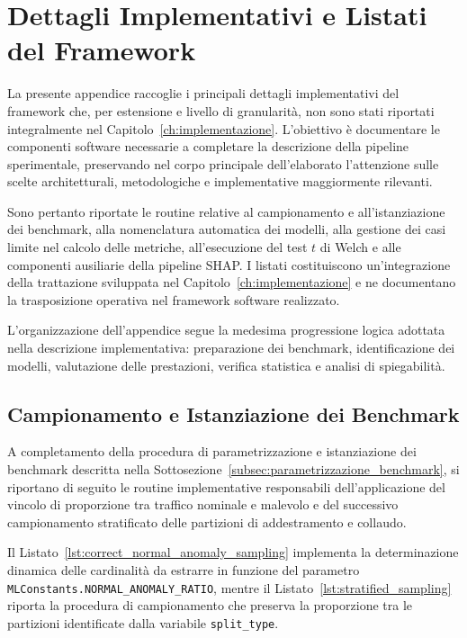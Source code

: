 \chapter{Dettagli Implementativi e Listati del Framework}
\label{app:implementazione}

La presente appendice raccoglie i principali dettagli implementativi del framework che, per estensione e livello di granularità, non sono stati riportati integralmente nel Capitolo~\ref{ch:implementazione}.
L'obiettivo è documentare le componenti software necessarie a completare la descrizione della pipeline sperimentale, preservando nel corpo principale dell'elaborato l'attenzione sulle scelte architetturali, metodologiche e implementative maggiormente rilevanti.

Sono pertanto riportate le routine relative al campionamento e all'istanziazione dei benchmark, alla nomenclatura automatica dei modelli, alla gestione dei casi limite nel calcolo delle metriche, all'esecuzione del test $t$ di Welch e alle componenti ausiliarie della pipeline SHAP.
I listati costituiscono un'integrazione della trattazione sviluppata nel Capitolo~\ref{ch:implementazione} e ne documentano la trasposizione operativa nel framework software realizzato.

L'organizzazione dell'appendice segue la medesima progressione logica adottata nella descrizione implementativa: preparazione dei benchmark, identificazione dei modelli, valutazione delle prestazioni, verifica statistica e analisi di spiegabilità.


\section{Campionamento e Istanziazione dei Benchmark}
\label{app:campionamento_benchmark}

A completamento della procedura di parametrizzazione e istanziazione dei benchmark descritta nella Sottosezione~\ref{subsec:parametrizzazione_benchmark}, si riportano di seguito le routine implementative responsabili dell'applicazione del vincolo di proporzione tra traffico nominale e malevolo e del successivo campionamento stratificato delle partizioni di addestramento e collaudo.

Il Listato~\ref{lst:correct_normal_anomaly_sampling} implementa la determinazione dinamica delle cardinalità da estrarre in funzione del parametro \texttt{MLConstants.NORMAL\_ANOMALY\_RATIO}, mentre il Listato~\ref{lst:stratified_sampling} riporta la procedura di campionamento che preserva la proporzione tra le partizioni identificate dalla variabile \texttt{split\_type}.

